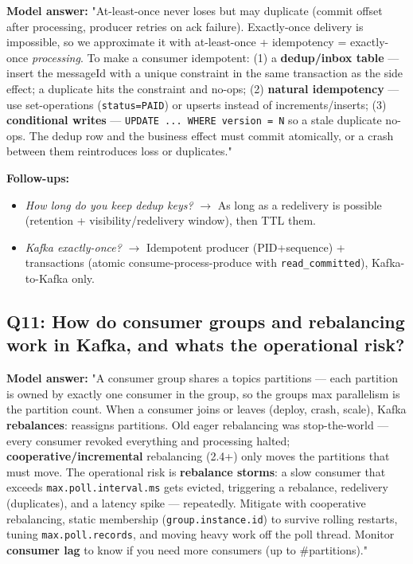 \documentclass[11pt]{article}
\providecommand{\tightlist}{\setlength{\itemsep}{1pt}\setlength{\parskip}{0pt}}
\begin{document}
\textbf{Model answer:} "At-least-once never loses but may duplicate (commit offset after processing, producer retries on ack failure). Exactly-once delivery is impossible, so we approximate it with at-least-once + idempotency = exactly-once \emph{processing}. To make a consumer idempotent: (1) a \textbf{dedup/inbox table} --- insert the messageId with a unique constraint in the same transaction as the side effect; a duplicate hits the constraint and no-ops; (2) \textbf{natural idempotency} --- use set-operations (\texttt{status=\textquotesingle{}PAID\textquotesingle{}}) or upserts instead of increments/inserts; (3) \textbf{conditional writes} --- \texttt{UPDATE\ ...\ WHERE\ version\ =\ N} so a stale duplicate no-ops. The dedup row and the business effect must commit atomically, or a crash between them reintroduces loss or duplicates."

\textbf{Follow-ups:}

\begin{itemize}
\tightlist
\item
  \emph{How long do you keep dedup keys?} \(\rightarrow\) As long as a redelivery is possible (retention + visibility/redelivery window), then TTL them.
\item
  \emph{Kafka exactly-once?} \(\rightarrow\) Idempotent producer (PID+sequence) + transactions (atomic consume-process-produce with \texttt{read\_committed}), Kafka-to-Kafka only.
\end{itemize}

\subsection{Q11: How do consumer groups and rebalancing work in Kafka, and what\textquotesingle s the operational risk?}\label{q11-how-do-consumer-groups-and-rebalancing-work-in-kafka-and-whats-the-operational-risk}

\textbf{Model answer:} "A consumer group shares a topic\textquotesingle s partitions --- each partition is owned by exactly one consumer in the group, so the group\textquotesingle s max parallelism is the partition count. When a consumer joins or leaves (deploy, crash, scale), Kafka \textbf{rebalances}: reassigns partitions. Old eager rebalancing was stop-the-world --- every consumer revoked everything and processing halted; \textbf{cooperative/incremental} rebalancing (2.4+) only moves the partitions that must move. The operational risk is \textbf{rebalance storms}: a slow consumer that exceeds \texttt{max.poll.interval.ms} gets evicted, triggering a rebalance, redelivery (duplicates), and a latency spike --- repeatedly. Mitigate with cooperative rebalancing, static membership (\texttt{group.instance.id}) to survive rolling restarts, tuning \texttt{max.poll.records}, and moving heavy work off the poll thread. Monitor \textbf{consumer lag} to know if you need more consumers (up to \#partitions)."
\end{document}
